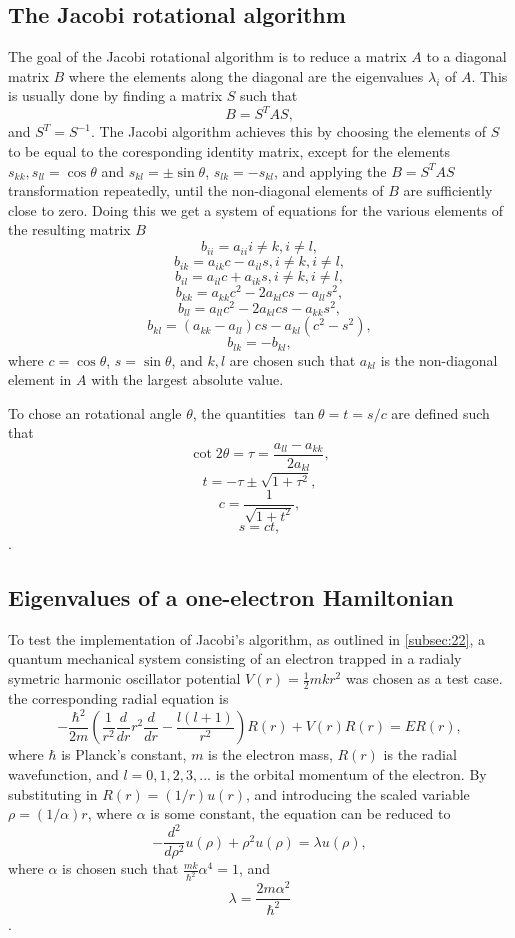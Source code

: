 \documentclass[english,notitlepage,reprint]{revtex4-1}  %
\begin{document}
\subsection{The Jacobi rotational algorithm}\label{subsec:22}
The goal of the Jacobi rotational algorithm is to reduce a matrix \(A\) to a diagonal matrix \(B\) where the elements along the diagonal are the eigenvalues \(\lambda_{i}\) of \(A\). This is usually done by finding a matrix \(S\) such that
$$
	B = S^{T}AS,
$$
and \(S^{T}=S^{-1}\)\citep{Hjorth-Jensen2019}. The Jacobi algorithm achieves this by choosing the elements of \(S\) to be equal to the coresponding identity matrix, except for the elements \(s_{kk},s_{ll}=\cos\theta\) and \(s_{kl} = \pm \sin\theta\), \(s_{lk} = -s_{kl}\)\citep{Hjorth-Jensen2019}, and applying the \(B = S^{T}AS\) transformation repeatedly, until the non-diagonal elements of \(B\) are sufficiently close to zero. Doing this we get a system of equations for the various elements of the resulting matrix \(B\)
$$
	b_{ii}=a_{ii} i\neq k, i\neq l,
$$
$$
	b_{ik}=a_{ik}c-a_{il}s, i\neq k, i\neq l,
$$
$$
	b_{il}=a_{il}c+a_{ik}s, i\neq k, i\neq l,
$$
$$
	b_{kk}=a_{kk}c^{2}-2a_{kl}cs-a_{ll}s^{2},
$$
$$
	b_{ll}=a_{ll}c^{2}-2a_{kl}cs-a_{kk}s^{2},
$$
$$
	b_{kl}=\left(a_{kk}-a_{ll}\right)cs-a_{kl}\left(c^{2}-s^{2}\right),
$$
$$
	b_{lk}=-b_{kl},
$$
where \(c = \cos\theta\), \(s = \sin\theta\), and \(k,l\) are chosen such that \(a_{kl}\) is the non-diagonal element in \(A\) with the largest absolute value.

To chose an rotational angle \(\theta\), the quantities \(\tan\theta=t=s/c\) are defined such that
$$
	\cot 2\theta = \tau = \frac{a_{ll}-a_{kk}}{2a_{kl}},
$$
$$
	t = -\tau \pm \sqrt{1+\tau^{2}},
$$
$$
	c = \frac{1}{\sqrt{1+t^{2}}},
$$
$$
	s = ct,
$$
\citep{Hjorth-Jensen2019}.

\subsection{Eigenvalues of a one-electron Hamiltonian}\label{subsec:23}
To test the implementation of Jacobi's algorithm, as outlined in \autoref{subsec:22}, a quantum mechanical system consisting of an electron trapped in a radialy symetric harmonic oscillator potential \(V(r)=\frac{1}{2}mkr^{2}\) was chosen as a test case.
the corresponding radial equation is
$$
	-\frac{\hbar^{2}}{2m}\left(\frac{1}{r^{2}}\frac{d}{dr}r^{2}\frac{d}{dr}-\frac{l\left(l+1\right)}{r^{2}}\right)R(r)+V(r)R(r)=ER(r),
$$
where \(\hbar\) is Planck's constant, \(m\) is the electron mass, \(R(r)\) is the radial wavefunction,  and \(l=0,1,2,3,...\) is the orbital momentum of the electron\citep{DepartmentofPhysics2019}. By substituting in \(R(r) = (1/r)u(r)\), and introducing the scaled variable \(\rho = (1/\alpha)r\), where \(\alpha\) is some constant, the equation can be reduced to
$$
	-\frac{d^{2}}{d\rho^{2}}u(\rho)+\rho^{2}u(\rho)=\lambda u(\rho),
$$
where \(\alpha\) is chosen such that \(\frac{mk}{\hbar^{2}}\alpha^{4} = 1\), and
$$
	\lambda=\frac{2m\alpha^{2}}{\hbar^{2}}
$$
\citep{DepartmentofPhysics2019}.
\end{document}

